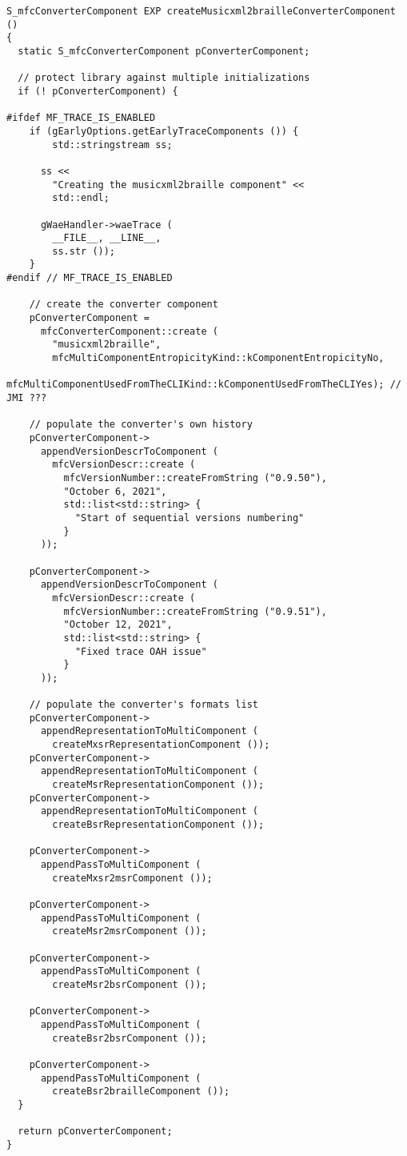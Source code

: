 \begin{lstlisting}[language=CPlusPlus]
S_mfcConverterComponent EXP createMusicxml2brailleConverterComponent ()
{
  static S_mfcConverterComponent pConverterComponent;

  // protect library against multiple initializations
  if (! pConverterComponent) {

#ifdef MF_TRACE_IS_ENABLED
    if (gEarlyOptions.getEarlyTraceComponents ()) {
	  	std::stringstream ss;

      ss <<
        "Creating the musicxml2braille component" <<
        std::endl;

      gWaeHandler->waeTrace (
        __FILE__, __LINE__,
        ss.str ());
    }
#endif // MF_TRACE_IS_ENABLED

    // create the converter component
    pConverterComponent =
      mfcConverterComponent::create (
        "musicxml2braille",
        mfcMultiComponentEntropicityKind::kComponentEntropicityNo,
        mfcMultiComponentUsedFromTheCLIKind::kComponentUsedFromTheCLIYes); // JMI ???

    // populate the converter's own history
    pConverterComponent->
      appendVersionDescrToComponent (
        mfcVersionDescr::create (
          mfcVersionNumber::createFromString ("0.9.50"),
          "October 6, 2021",
          std::list<std::string> {
            "Start of sequential versions numbering"
          }
      ));

    pConverterComponent->
      appendVersionDescrToComponent (
        mfcVersionDescr::create (
          mfcVersionNumber::createFromString ("0.9.51"),
          "October 12, 2021",
          std::list<std::string> {
            "Fixed trace OAH issue"
          }
      ));

    // populate the converter's formats list
    pConverterComponent->
      appendRepresentationToMultiComponent (
        createMxsrRepresentationComponent ());
    pConverterComponent->
      appendRepresentationToMultiComponent (
        createMsrRepresentationComponent ());
    pConverterComponent->
      appendRepresentationToMultiComponent (
        createBsrRepresentationComponent ());

    pConverterComponent->
      appendPassToMultiComponent (
        createMxsr2msrComponent ());

    pConverterComponent->
      appendPassToMultiComponent (
        createMsr2msrComponent ());

    pConverterComponent->
      appendPassToMultiComponent (
        createMsr2bsrComponent ());

    pConverterComponent->
      appendPassToMultiComponent (
        createBsr2bsrComponent ());

    pConverterComponent->
      appendPassToMultiComponent (
        createBsr2brailleComponent ());
  }

  return pConverterComponent;
}
\end{lstlisting}


